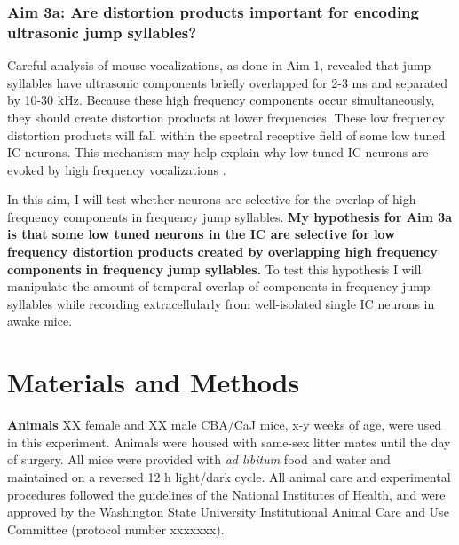 \documentclass[12pt]{article}
\begin{document}
\subsubsection*{Aim 3a: Are distortion products important for encoding ultrasonic jump syllables?}
Careful analysis of mouse vocalizations, as done in Aim 1, revealed that jump syllables have ultrasonic components briefly overlapped for 2-3 ms and separated by 10-30 kHz. Because these high frequency components occur simultaneously, they should create distortion products at lower frequencies. These low frequency distortion products will fall within the spectral receptive field of some low tuned IC neurons. This mechanism may help explain why low tuned IC neurons are evoked by high frequency vocalizations \cite{portforsover-representation2009, portforsmismatch2013}.

In this aim, I will test whether neurons are selective for the overlap of high frequency components in frequency jump syllables. \textbf{My hypothesis for Aim 3a is that some low tuned neurons in the IC are selective for low frequency distortion products created by overlapping high frequency components in frequency jump syllables.} To test this hypothesis I will manipulate the amount of temporal overlap of components in frequency jump syllables while recording extracellularly from well-isolated single IC neurons in awake mice.


\section*{\label{sec:methods}Materials and Methods}
\vspace{3mm}
\textbf{Animals}
XX female and XX male CBA/CaJ mice, x-y weeks of age, were used in this experiment. Animals were housed with same-sex litter mates until the day of surgery. All mice were provided with \textit{ad libitum} food and water and maintained on a reversed 12 h light/dark cycle. All animal care and experimental procedures followed the guidelines of the National Institutes of Health, and were approved by the Washington State University Institutional Animal Care and Use Committee (protocol number xxxxxxx).
\end{document}
